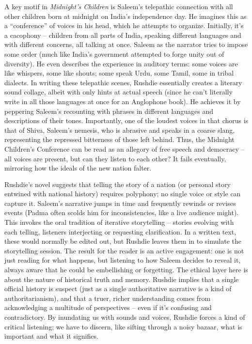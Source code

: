 \documentclass[12pt]{report}
\begin{document}
A key motif in \textit{Midnight’s Children} is Saleem’s telepathic connection with all other children born at midnight on India’s independence day. He imagines this as a “conference” of voices in his head, which he attempts to organize. Initially, it’s a cacophony – children from all parts of India, speaking different languages and with different concerns, all talking at once. Saleem as the narrator tries to impose some order (much like India’s government attempted to forge unity out of diversity). He even describes the experience in auditory terms: some voices are like whispers, some like shouts; some speak Urdu, some Tamil, some in tribal dialects. In writing these telepathic scenes, Rushdie essentially creates a literary sound collage, albeit with only hints at actual speech (since he can’t literally write in all those languages at once for an Anglophone book). He achieves it by peppering Saleem’s recounting with phrases in different languages and descriptions of their tones. Importantly, one of the loudest voices in that chorus is that of Shiva, Saleem’s nemesis, who is abrasive and speaks in a coarse slang, representing the repressed bitterness of those left behind. Thus, the Midnight Children’s Conference can be read as an allegory of free speech and democracy – all voices are present, but can they listen to each other? It fails eventually, mirroring how the ideals of the new nation falter. 

Rushdie’s novel suggests that telling the story of a nation (or personal story entwined with national history) requires polyphony; no single voice or style can capture it. Saleem’s narrative jumps in time and frequently rewinds or revises events (Padma often scolds him for inconsistencies, like a live audience might). This invokes the oral tradition of iterative storytelling – stories evolving with each telling, listeners interjecting or requesting clarification. In a written text, these would normally be edited out, but Rushdie leaves them in to simulate the storytelling session. The result for the reader is an active engagement: one is not just reading for what happens, but listening to how Saleem decides to reveal it, always aware that he could be embellishing or forgetting. The ethical layer here is about the nature of historical truth and memory. Rushdie implies that a single official history is suspect (just as a single authoritative narrative is a kind of authoritarianism), and that a truer, richer understanding comes from acknowledging a multitude of perspectives – even if it’s confusing and contradictory. By inundating us with sounds and voices, Rushdie forces a kind of critical listening; we have to discern, like sifting through a noisy bazaar, what is important and what it signifies.
\end{document}
